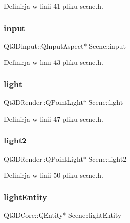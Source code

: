 Definicja w linii 41 pliku scene.\+h.

\mbox{\label{class_scene_aa17e5d3b3393d6ea4cbbf7ab981b5b62}} 
\subsubsection{\texorpdfstring{input}{input}}
{\footnotesize\ttfamily Qt3\+D\+Input\+::\+Q\+Input\+Aspect$\ast$ Scene\+::input\hspace{0.3cm}{\ttfamily [private]}}



Definicja w linii 43 pliku scene.\+h.

\mbox{\label{class_scene_ac2f294ceccf5b708d6dcdd540e51d787}} 
\subsubsection{\texorpdfstring{light}{light}}
{\footnotesize\ttfamily Qt3\+D\+Render\+::\+Q\+Point\+Light$\ast$ Scene\+::light\hspace{0.3cm}{\ttfamily [private]}}



Definicja w linii 47 pliku scene.\+h.

\mbox{\label{class_scene_a7a9feb72cc710357f6166f5ec45369cd}} 
\subsubsection{\texorpdfstring{light2}{light2}}
{\footnotesize\ttfamily Qt3\+D\+Render\+::\+Q\+Point\+Light$\ast$ Scene\+::light2\hspace{0.3cm}{\ttfamily [private]}}



Definicja w linii 50 pliku scene.\+h.

\mbox{\label{class_scene_a932f32946da0283ac184a28cb13f4427}} 
\subsubsection{\texorpdfstring{light\+Entity}{lightEntity}}
{\footnotesize\ttfamily Qt3\+D\+Core\+::\+Q\+Entity$\ast$ Scene\+::light\+Entity\hspace{0.3cm}{\ttfamily [private]}}




